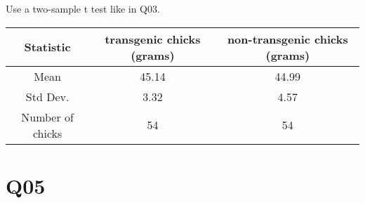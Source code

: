 \documentclass[11pt]{article}
\begin{document}
Use a two-sample t test like in Q03. 


\begin{table}[ht!]
  \begin{tabular}{c|cc}
    \hline
    Statistic & transgenic chicks (grams) & non-transgenic chicks (grams)\\
    \hline
    Mean      & 45.14   & 44.99 \\
    Std Dev.  & 3.32    & 4.57 \\
    Number of chicks & 54 & 54  \\
    \hline
  \end{tabular}
\end{table}

\clearpage

\section*{Q05}
\end{document}

